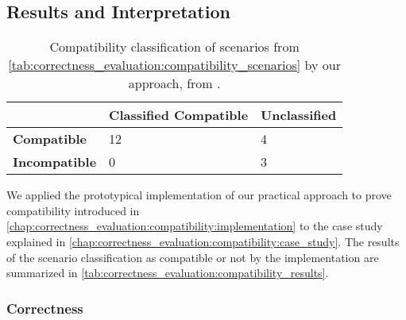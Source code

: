 \subsection{Results and Interpretation}

\begin{table}
    \centering
    \small
    \renewcommand{\arraystretch}{1.2}%
    \setlength\tabcolsep{4 pt}
    \begin{tabular}{L{2cm} C{3.5cm} C{2.3cm}}
        \toprule
         & \textbf{Classified Compatible} & \textbf{Unclassified} \\
         \midrule
         \textbf{Compatible} & 12 & 4\\
         \textbf{Incompatible} & 0 & 3\\
         \bottomrule
    \end{tabular}
    \caption[Correctness of compatibility classification results]{Compatibility classification of scenarios from \autoref{tab:correctness_evaluation:compatibility_scenarios} by our approach, from .}
    \label{tab:correctness_evaluation:compatibility_results}
\end{table}

We applied the prototypical implementation of our practical approach to prove compatibility introduced in \autoref{chap:correctness_evaluation:compatibility:implementation} to the case study explained in \autoref{chap:correctness_evaluation:compatibility:case_study}.
The results of the scenario classification as compatible or not by the implementation are summarized in \autoref{tab:correctness_evaluation:compatibility_results}.


\subsubsection{Correctness}

